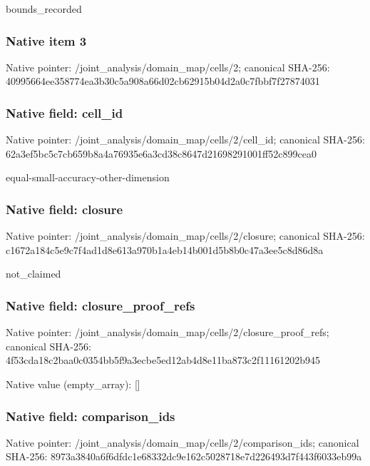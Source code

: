 \documentclass[10pt,a4paper]{article}
\begin{document}
\begingroup\raggedright\sloppy bounds\_\allowbreak{}recorded\par\endgroup

\subsubsection{Native item 3}
Native pointer: /joint\_\allowbreak{}analysis/domain\_\allowbreak{}map/cells/2; canonical SHA-256: 40995664ee358774ea3b30c5a908a66d02cb62915b04d2a0c7fbbf7f27874031

\subsubsection{Native field: cell\_\allowbreak{}id}
Native pointer: /joint\_\allowbreak{}analysis/domain\_\allowbreak{}map/cells/2/cell\_\allowbreak{}id; canonical SHA-256: 62a3ef5bc5c7cb659b8a4a76935e6a3cd38c8647d21698291001ff52c899cea0

\begingroup\raggedright\sloppy equal-small-accuracy-other-dimension\par\endgroup

\subsubsection{Native field: closure}
Native pointer: /joint\_\allowbreak{}analysis/domain\_\allowbreak{}map/cells/2/closure; canonical SHA-256: c1672a184c5e9c7f4ad1d8e613a970b1a4eb14b001d5b8b0c47a3ee5c8d86d8a

\begingroup\raggedright\sloppy not\_\allowbreak{}claimed\par\endgroup

\subsubsection{Native field: closure\_\allowbreak{}proof\_\allowbreak{}refs}
Native pointer: /joint\_\allowbreak{}analysis/domain\_\allowbreak{}map/cells/2/closure\_\allowbreak{}proof\_\allowbreak{}refs; canonical SHA-256: 4f53cda18c2baa0c0354bb5f9a3ecbe5ed12ab4d8e11ba873c2f11161202b945

Native value (empty\_\allowbreak{}array): []

\subsubsection{Native field: comparison\_\allowbreak{}ids}
Native pointer: /joint\_\allowbreak{}analysis/domain\_\allowbreak{}map/cells/2/comparison\_\allowbreak{}ids; canonical SHA-256: 8973a3840a6f6dfdc1e68332dc9e162c5028718e7d226493d7f443f6033eb99a
\end{document}
